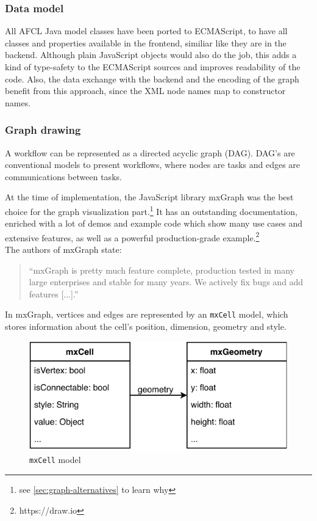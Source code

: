 \documentclass[a4paper,12pt,pdftex,halfparskip,cleardoubleempty,bibtotoc,liststotoc]{scrbook}
\begin{document}
\subsubsection{Data model}

All AFCL Java model classes have been ported to ECMAScript, to have all classes and properties available in the frontend, similiar like they are in the backend. Although plain JavaScript objects would also do the job, this adds a kind of type-safety to the ECMAScript sources and improves readability of the code. Also, the data exchange with the backend and the encoding of the graph benefit from this approach, since the XML node names map to constructor names.

\subsubsection{Graph drawing}

A workflow can be represented as a directed acyclic graph (DAG). DAG's are conventional models to present workflows, where nodes are tasks and edges are communications between tasks.

At the time of implementation, the JavaScript library mxGraph was the best choice for the graph visualization part.\footnote{see \ref{sec:graph-alternatives} to learn why}
It has an outstanding documentation, enriched with a lot of demos and example code which show many use cases and extensive features, as well as a powerful production-grade example.\footnote{https://draw.io}\\
The authors of mxGraph state:\\
\begin{quote}
``mxGraph is pretty much feature complete, production tested in many large enterprises and stable for many years. We actively fix bugs and add features [...].''
\end{quote}

In mxGraph, vertices and edges are represented by an \texttt{mxCell} model, which stores information about the cell's position, dimension, geometry and style.

\begin{figure}[H]
  \centering
  \vspace{0.8cm}
  \includegraphics[]{mxCell}
  \caption{\texttt{mxCell} model}
\end{figure}
\end{document}

